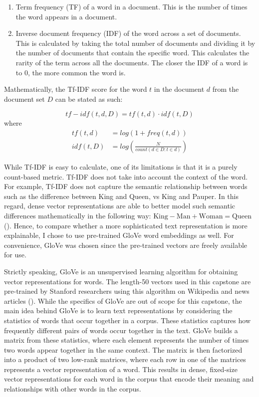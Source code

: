 \begin{enumerate}
	\item Term frequency (TF) of a word in a document. This is the number of times the word appears in a document.
	\item Inverse document frequency (IDF) of the word across a set of documents. This is calculated by taking the total number of documents and dividing it by the number of documents that contain the specific word. This calculates the rarity of the term across all the documents. The closer the IDF of a word is to 0, the more common the word is.
\end{enumerate}

Mathematically, the Tf-IDF score for the word $t$ in the document $d$ from the document set $D$ can be stated as such:

\[tf-idf(t, d, D) = tf(t, d) \cdot idf(t, D)\]
where 
\begin{align*}
	tf(t, d) &= log(1 + freq(t, d )) \\
	idf(t, D) &= log\left(\frac{N}{count(d \in D : t \in d)}\right)
\end{align*}

While Tf-IDF is easy to calculate, one of its limitations is that it is a purely count-based metric. Tf-IDF does not take into account the context of the word. For example, Tf-IDF does not capture the semantic relationship between words such as the difference between King and Queen, vs King and Pauper. In this regard, dense vector representations are able to better model such semantic differences mathematically in the following way: $\text{King} - \text{Man} + \text{Woman} = \text{Queen}$ (\cite{vector_differences_2015}). Hence, to compare whether a more sophisticated text representation is more explainable, I chose to use pre-trained GloVe word embeddings as well. For convenience, GloVe was chosen since the pre-trained vectors are freely available for use.

Strictly speaking, GloVe is an unsupervised learning algorithm for obtaining vector representations for words. The length-50 vectors used in this capstone are pre-trained by Stanford researchers using this algorithm on Wikipedia and news articles (\cite{pennington2014glove}). While the specifics of GloVe are out of scope for this capstone, the main idea behind GloVe is to learn text representations by considering the statistics of words that occur together in a corpus. These statistics captures how frequently different pairs of words occur together in the text. GloVe builds a matrix from these statistics, where each element represents the number of times two words appear together in the same context. The matrix is then factorized into a product of two low-rank matrices, where each row in one of the matrices represents a vector representation of a word. This results in dense, fixed-size vector representations for each word in the corpus that encode their meaning and relationships with other words in the corpus.

